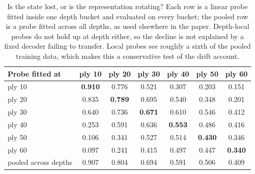 \begin{table}[t]
\centering\small
\caption{Is the state lost, or is the representation rotating? Each row
is a linear probe fitted inside one depth bucket and evaluated on every
bucket; the pooled row is a probe fitted across all depths, as used
elsewhere in the paper. Depth-local probes do not hold up at depth either,
so the decline is not explained by a fixed decoder failing to transfer.
Local probes see roughly a sixth of the pooled training data, which makes
this a conservative test of the drift account.}
\label{tab:drift}
\begin{tabular}{lcccccc}
\toprule
Probe fitted at & ply 10 & ply 20 & ply 30 & ply 40 & ply 50 & ply 60 \\
\midrule
ply 10 & \textbf{0.910} & 0.776 & 0.521 & 0.307 & 0.203 & 0.151 \\
ply 20 & 0.835 & \textbf{0.789} & 0.695 & 0.540 & 0.348 & 0.201 \\
ply 30 & 0.640 & 0.736 & \textbf{0.671} & 0.610 & 0.546 & 0.412 \\
ply 40 & 0.253 & 0.591 & 0.636 & \textbf{0.553} & 0.486 & 0.416 \\
ply 50 & 0.106 & 0.341 & 0.527 & 0.514 & \textbf{0.430} & 0.346 \\
ply 60 & 0.097 & 0.241 & 0.415 & 0.497 & 0.447 & \textbf{0.340} \\
\midrule
pooled across depths & 0.907 & 0.804 & 0.694 & 0.591 & 0.506 & 0.409 \\
\bottomrule
\end{tabular}
\end{table}
